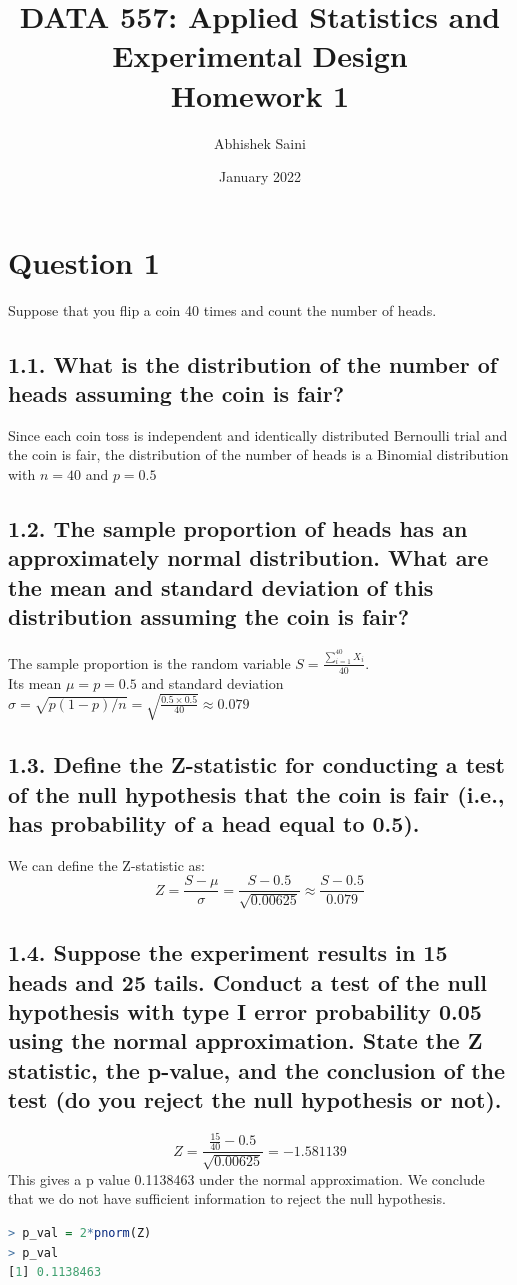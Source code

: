 \documentclass[11pt]{article}
\title{DATA 557: Applied Statistics and Experimental Design \\ Homework 1}
\author{Abhishek Saini}
\date{January 2022}
\begin{document}
\maketitle

\section*{Question 1}
Suppose that you flip a coin 40 times and count the number of heads.

\subsection*{1.1. What is the distribution of the number of heads assuming the coin is fair?}
Since each coin toss is independent and identically distributed Bernoulli trial and the coin is fair, the distribution of the number of heads is a Binomial distribution with $n = 40$ and $p=0.5$

\subsection*{1.2. The sample proportion of heads has an approximately normal distribution. What are the mean and standard deviation of this distribution assuming the coin is fair?}
The sample proportion is the random variable $S = \frac{\sum_{i=1}^{40}X_i} {40} $. \\
Its mean $\mu = p = 0.5$ and standard deviation $\sigma = \sqrt{p(1-p)/n} = \sqrt{\frac{0.5\times0.5}{40}} \approx 0.079$

\subsection*{1.3. Define the Z-statistic for conducting a test of the null hypothesis that the coin is fair (i.e., has probability of a head equal to 0.5).}
We can define the Z-statistic as:
\begin{equation*}
    Z = \frac{S-\mu}{\sigma} = \frac{S-0.5}{\sqrt{0.00625}} \approx \frac{S-0.5}{0.079}
\end{equation*}

\subsection*{1.4. Suppose the experiment results in 15 heads and 25 tails. Conduct a test of the null hypothesis with type I error probability 0.05 using the normal approximation. State the Z statistic, the p-value, and the conclusion of the test (do you reject the null hypothesis or not).}
\begin{equation*}
    Z = \frac{\frac{15}{40} - 0.5}{\sqrt{0.00625}} = -1.581139
\end{equation*}
This gives a p value 0.1138463 under the normal approximation. We conclude that we do not have sufficient information to reject the null hypothesis.
\begin{lstlisting}[language=R]
> p_val = 2*pnorm(Z)
> p_val
[1] 0.1138463
\end{lstlisting}
\end{document}
